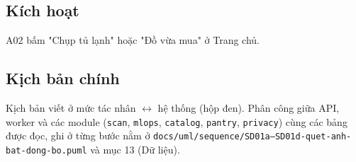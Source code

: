 \subsection{Kích hoạt}
A02 bấm "Chụp tủ lạnh" hoặc "Đồ vừa mua" ở Trang chủ.

\subsection{Kịch bản chính}
Kịch bản viết ở mức tác nhân \ensuremath{\leftrightarrow} hệ thống (hộp đen). Phân công giữa API, worker và các module ({\small\texttt{scan}}, {\small\texttt{mlops}}, {\small\texttt{catalog}}, {\small\texttt{pantry}}, {\small\texttt{privacy}}) cùng các bảng được đọc, ghi ở từng bước nằm ở {\small\texttt{docs/\allowbreak{}\allowbreak{}uml/\allowbreak{}\allowbreak{}sequence/\allowbreak{}\allowbreak{}SD01a–SD01d-\allowbreak{}quet-\allowbreak{}anh-\allowbreak{}bat-\allowbreak{}dong-\allowbreak{}bo.\allowbreak{}puml}} và mục 13 (Dữ liệu).

